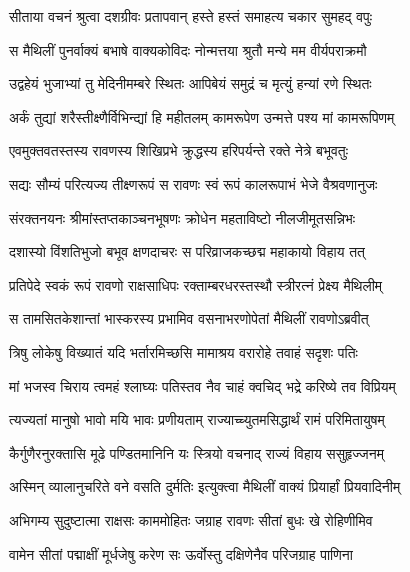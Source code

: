 
\twolineshloka
{सीताया वचनं श्रुत्वा दशग्रीवः प्रतापवान्}
{हस्ते हस्तं समाहत्य चकार सुमहद् वपुः} %

\twolineshloka
{स मैथिलीं पुनर्वाक्यं बभाषे वाक्यकोविदः}
{नोन्मत्तया श्रुतौ मन्ये मम वीर्यपराक्रमौ} %

\twolineshloka
{उद्वहेयं भुजाभ्यां तु मेदिनीमम्बरे स्थितः}
{आपिबेयं समुद्रं च मृत्युं हन्यां रणे स्थितः} %

\twolineshloka
{अर्कं तुद्यां शरैस्तीक्ष्णैर्विभिन्द्यां हि महीतलम्}
{कामरूपेण उन्मत्ते पश्य मां कामरूपिणम्} %

\twolineshloka
{एवमुक्तवतस्तस्य रावणस्य शिखिप्रभे}
{क्रुद्धस्य हरिपर्यन्ते रक्ते नेत्रे बभूवतुः} %

\twolineshloka
{सद्यः सौम्यं परित्यज्य तीक्ष्णरूपं स रावणः}
{स्वं रूपं कालरूपाभं भेजे वैश्रवणानुजः} %

\twolineshloka
{संरक्तनयनः श्रीमांस्तप्तकाञ्चनभूषणः}
{क्रोधेन महताविष्टो नीलजीमूतसन्निभः} %

\twolineshloka
{दशास्यो विंशतिभुजो बभूव क्षणदाचरः}
{स परिव्राजकच्छद्म महाकायो विहाय तत्} %

\twolineshloka
{प्रतिपेदे स्वकं रूपं रावणो राक्षसाधिपः}
{रक्ताम्बरधरस्तस्थौ स्त्रीरत्नं प्रेक्ष्य मैथिलीम्} %

\twolineshloka
{स तामसितकेशान्तां भास्करस्य प्रभामिव}
{वसनाभरणोपेतां मैथिलीं रावणोऽब्रवीत्} %

\twolineshloka
{त्रिषु लोकेषु विख्यातं यदि भर्तारमिच्छसि}
{मामाश्रय वरारोहे तवाहं सदृशः पतिः} %

\twolineshloka
{मां भजस्व चिराय त्वमहं श्लाघ्यः पतिस्तव}
{नैव चाहं क्वचिद् भद्रे करिष्ये तव विप्रियम्} %

\twolineshloka
{त्यज्यतां मानुषो भावो मयि भावः प्रणीयताम्}
{राज्याच्च्युतमसिद्धार्थं रामं परिमितायुषम्} %

\twolineshloka
{कैर्गुणैरनुरक्तासि मूढे पण्डितमानिनि}
{यः स्त्रियो वचनाद् राज्यं विहाय ससुहृज्जनम्} %

\twolineshloka
{अस्मिन् व्यालानुचरिते वने वसति दुर्मतिः}
{इत्युक्त्वा मैथिलीं वाक्यं प्रियार्हां प्रियवादिनीम्} %

\twolineshloka
{अभिगम्य सुदुष्टात्मा राक्षसः काममोहितः}
{जग्राह रावणः सीतां बुधः खे रोहिणीमिव} %

\twolineshloka
{वामेन सीतां पद्माक्षीं मूर्धजेषु करेण सः}
{ऊर्वोस्तु दक्षिणेनैव परिजग्राह पाणिना} %

